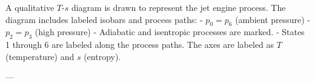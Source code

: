 A qualitative \( T \)-\( s \) diagram is drawn to represent the jet engine process. The diagram includes labeled isobars and process paths:  
- \( p_0 = p_6 \) (ambient pressure)  
- \( p_2 = p_3 \) (high pressure)  
- Adiabatic and isentropic processes are marked.  
- States 1 through 6 are labeled along the process paths.  
The axes are labeled as \( T \) (temperature) and \( s \) (entropy).  

---
